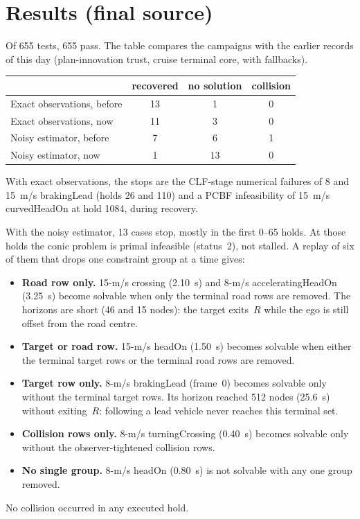 \documentclass[11pt]{article}
\begin{document}
\section{Results (final source)}
Of 655 tests, 655 pass. The table compares the campaigns with the earlier
records of this day (plan-innovation trust, cruise terminal core, with fallbacks).

\begin{center}
\begin{tabular}{lccc}
\toprule
 & recovered & no solution & collision\\
\midrule
Exact observations, before & 13 & 1 & 0\\
Exact observations, now & 11 & 3 & 0\\
Noisy estimator, before & 7 & 6 & 1\\
Noisy estimator, now & 1 & 13 & 0\\
\bottomrule
\end{tabular}
\end{center}

With exact observations, the stops are the CLF-stage numerical failures of
8 and 15~m/s brakingLead (holds 26 and 110) and a PCBF infeasibility of 15~m/s
curvedHeadOn at hold 1084, during recovery.

With the noisy estimator, 13 cases stop, mostly in the first 0--65 holds. At
those holds the conic problem is primal infeasible (status~2), not stalled. A
replay of six of them that drops one constraint group at a time gives:
\begin{itemize}
\item \textbf{Road row only.} 15-m/s crossing (2.10~s) and 8-m/s
  acceleratingHeadOn (3.25~s) become solvable when only the terminal road rows
  are removed. The horizons are short (46 and 15 nodes): the target exits~$R$
  while the ego is still offset from the road centre.
\item \textbf{Target or road row.} 15-m/s headOn (1.50~s) becomes solvable when
  either the terminal target rows or the terminal road rows are removed.
\item \textbf{Target row only.} 8-m/s brakingLead (frame~0) becomes solvable
  only without the terminal target rows. Its horizon reached 512 nodes
  (25.6~s) without exiting~$R$: following a lead vehicle never reaches this
  terminal set.
\item \textbf{Collision rows only.} 8-m/s turningCrossing (0.40~s) becomes
  solvable only without the observer-tightened collision rows.
\item \textbf{No single group.} 8-m/s headOn (0.80~s) is not solvable with any
  one group removed.
\end{itemize}
No collision occurred in any executed hold.
\end{document}
